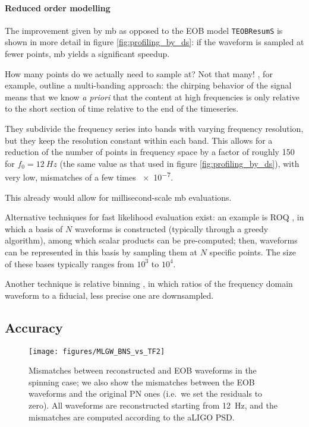 \documentclass[main.tex]{subfiles}
\begin{document}
\paragraph{Reduced order modelling}

The improvement given by \ac{mb} as opposed to the \ac{EOB} model \texttt{TEOBResumS} is shown in more detail in figure \ref{fig:profiling_by_ds}: if the waveform is sampled at fewer points, \ac{mb} yields a significant speedup. 

How many points do we actually need to sample at? Not that many! 
\textcite{vinciguerraAcceleratingGravitationalWave2017}, for example, outline a multi-banding approach: the chirping behavior of the signal means that we know \emph{a priori} that the content at high frequencies is only relative to the short section of time relative to the end of the timeseries. 

They subdivide the frequency series into bands with varying frequency resolution, but they keep the resolution constant within each band.
This allows for a reduction of the number of points in frequency space by a factor of roughly 150 for \(f_0 = \SI{12}{Hz}\) (the same value as that used in figure \ref{fig:profiling_by_ds}), with very low, mismatches of a few times \num{e-7}. 

This already would allow for millisecond-scale \ac{mb} evaluations. 

Alternative techniques for fast likelihood evaluation exist: an example is \ac{ROQ} \cites{smithFastAccurateInference2016}{canizaresAcceleratedGravitationalWave2015}, in which a basis of \(N\) waveforms is constructed (typically through a greedy algorithm), among which scalar products can be pre-computed; then, waveforms can be represented in this basis by sampling them at \(N\) specific points. 
The size of these bases typically ranges from \(10^3\) to \(10^4\). 

Another technique is relative binning \cite{zackayRelativeBinningFast2018}, in which ratios of the frequency domain waveform to a fiducial, less precise one are downsampled. 


\subsection{Accuracy} \label{sec:accuracy}

\begin{figure}[ht]
\centering
\texttt{[image: figures/MLGW\_BNS\_vs\_TF2]}
\caption{Mismatches between reconstructed and \ac{EOB} waveforms in the spinning case; we also show the mismatches between the \ac{EOB} waveforms and the original \ac{PN} ones (i.e.\ we set the residuals to zero). All waveforms are reconstructed starting from \SI{12}{Hz}, and the mismatches are computed according to the \ac{aLIGO} \ac{PSD}.}
\label{fig:MLGW_BNS_vs_TF2}
\end{figure}
\end{document}
